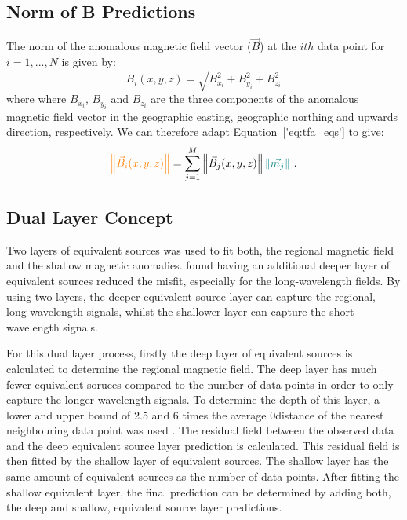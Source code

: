 \subsection{Norm of B Predictions}
The norm of the anomalous magnetic field vector ($\vec{B}$) at the $ith$ data point for $i = 1,...,N$ is given by:
\begin{equation}
    B_i(x,y,z) = \sqrt{B^2_{x_i} + B^2_{y_i} +B^2_{z_i}}
\end{equation}
where where $B_{x_i}$, $B_{y_i}$ and $B_{z_i}$ are the three components of the anomalous magnetic field vector in the geographic easting, geographic northing and upwards direction, respectively. We can therefore adapt Equation~\ref{'eq:tfa_eqs'} to give:
\begin{equation}
\textcolor{orange}{\left\lVert \vec{B}_{i}(x,y,z) \right\rVert} = \sum_{j=1}^{M}  \left\lVert \vec{B}_{j}(x,y,z) \right\rVert \textcolor{teal}{\left\lVert \vec{m_j} \right\rVert}
\ .
\end{equation}


\subsection{Dual Layer Concept}
Two layers of equivalent sources was used to fit both, the regional magnetic field and the shallow magnetic anomalies. \citep{Li2019} found having an additional deeper layer of equivalent sources reduced the misfit, especially for the long‐wavelength fields. By using two layers, the deeper equivalent source layer can capture the regional, long-wavelength signals, whilst the shallower layer can capture the short-wavelength signals.

For this dual layer process, firstly the deep layer of equivalent sources is calculated to determine the regional magnetic field. The deep layer has much fewer equivalent soruces compared to the number of data points in order to only capture the longer-wavelength signals. To determine the depth of this layer, a lower and upper bound of 2.5 and 6 times the average 0distance of the nearest neighbouring data point was used \citep{Dampney1969}. The residual field between the observed data and the deep equivalent source layer prediction is calculated. This residual field is then fitted by the shallow layer of equivalent sources. The shallow layer has the same amount of equivalent sources as the number of data points. After fitting the shallow equivalent layer, the final prediction can be determined by adding both, the deep and shallow, equivalent source layer predictions.

